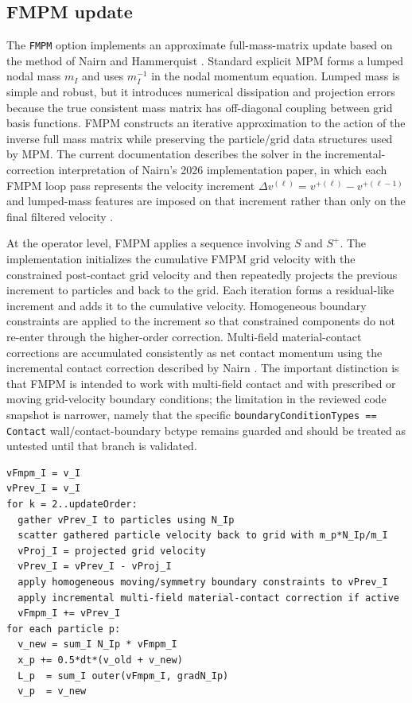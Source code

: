 \subsection{FMPM update}
\label{subsec:fmpm-update}

The \texttt{FMPM} option implements an approximate full-mass-matrix update based on the method of Nairn and Hammerquist \cite{nairn2021fmpm}.  Standard explicit MPM forms a lumped nodal mass $m_I$ and uses $m_I^{-1}$ in the nodal momentum equation.  Lumped mass is simple and robust, but it introduces numerical dissipation and projection errors because the true consistent mass matrix has off-diagonal coupling between grid basis functions.  FMPM constructs an iterative approximation to the action of the inverse full mass matrix while preserving the particle/grid data structures used by MPM.  The current documentation describes the solver in the incremental-correction interpretation of Nairn's 2026 implementation paper, in which each FMPM loop pass represents the velocity increment $\Delta v^{(\ell)}=v^{+(\ell)}-v^{+(\ell-1)}$ and lumped-mass features are imposed on that increment rather than only on the final filtered velocity \cite{nairn2026fmpm}.

At the operator level, FMPM applies a sequence involving $S$ and $S^+$.  The implementation initializes the cumulative FMPM grid velocity with the constrained post-contact grid velocity and then repeatedly projects the previous increment to particles and back to the grid.  Each iteration forms a residual-like increment and adds it to the cumulative velocity.  Homogeneous boundary constraints are applied to the increment so that constrained components do not re-enter through the higher-order correction.  Multi-field material-contact corrections are accumulated consistently as net contact momentum using the incremental contact correction described by Nairn \cite{nairn2026fmpm}.  The important distinction is that FMPM is intended to work with multi-field contact and with prescribed or moving grid-velocity boundary conditions; the limitation in the reviewed code snapshot is narrower, namely that the specific \texttt{boundaryConditionTypes == Contact} wall/contact-boundary bctype remains guarded and should be treated as untested until that branch is validated.

\begin{lstlisting}[caption={FMPM approximate full-mass update.},basicstyle=\ttfamily\small]
vFmpm_I = v_I
vPrev_I = v_I
for k = 2..updateOrder:
  gather vPrev_I to particles using N_Ip
  scatter gathered particle velocity back to grid with m_p*N_Ip/m_I
  vProj_I = projected grid velocity
  vPrev_I = vPrev_I - vProj_I
  apply homogeneous moving/symmetry boundary constraints to vPrev_I
  apply incremental multi-field material-contact correction if active
  vFmpm_I += vPrev_I
for each particle p:
  v_new = sum_I N_Ip * vFmpm_I
  x_p += 0.5*dt*(v_old + v_new)
  L_p  = sum_I outer(vFmpm_I, gradN_Ip)
  v_p  = v_new
\end{lstlisting}

